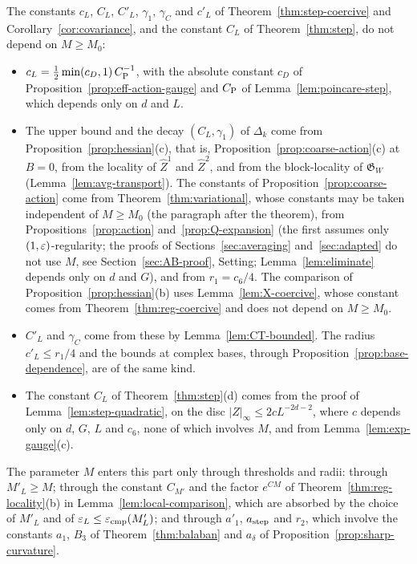 \begin{remark}\label{rem:step-M}
The constants $c_L$, $C_L$, $C'_L$, $\gamma_1$, $\gamma_C$ and $c'_L$ of Theorem~\ref{thm:step-coercive} and Corollary~\ref{cor:covariance}, and the constant $C_L$ of Theorem~\ref{thm:step}, do not depend on $M\ge M_0$:
\begin{itemize}
\item $c_L=\frac12\min(c_D,1)\,C_{\rm P}^{-1}$, with the absolute constant $c_D$ of Proposition~\ref{prop:eff-action-gauge} and $C_{\rm P}$ of Lemma~\ref{lem:poincare-step}, which depends only on $d$ and $L$.
\item The upper bound and the decay $(C_L,\gamma_1)$ of $\Delta_k$ come from Proposition~\ref{prop:hessian}(c), that is, Proposition~\ref{prop:coarse-action}(c) at $B=0$, from the locality of $\hat Z^1$ and $\hat Z^2$, and from the block-locality of $\mathfrak G_W$ (Lemma~\ref{lem:avg-transport}). The constants of Proposition~\ref{prop:coarse-action} come from Theorem~\ref{thm:variational}, whose constants may be taken independent of $M\ge M_0$ (the paragraph after the theorem), from Propositions~\ref{prop:action} and~\ref{prop:Q-expansion} (the first assumes only $(1,\varepsilon)$-regularity; the proofs of Sections~\ref{sec:averaging} and~\ref{sec:adapted} do not use $M$, see Section~\ref{sec:AB-proof}, Setting; Lemma~\ref{lem:eliminate} depends only on $d$ and $G$), and from $r_1=c_6/4$. The comparison of Proposition~\ref{prop:hessian}(b) uses Lemma~\ref{lem:X-coercive}, whose constant comes from Theorem~\ref{thm:reg-coercive} and does not depend on $M\ge M_0$.
\item $C'_L$ and $\gamma_C$ come from these by Lemma~\ref{lem:CT-bounded}. The radius $c'_L\le r_1/4$ and the bounds at complex bases, through Proposition~\ref{prop:base-dependence}, are of the same kind.
\item The constant $C_L$ of Theorem~\ref{thm:step}(d) comes from the proof of Lemma~\ref{lem:step-quadratic}, on the disc $|Z|_\infty\le2cL^{-2d-2}$, where $c$ depends only on $d$, $G$, $L$ and $c_6$, none of which involves $M$, and from Lemma~\ref{lem:exp-gauge}(c).
\end{itemize}
The parameter $M$ enters this part only through thresholds and radii: through $M'_L\ge M$; through the constant $C_{M'}$ and the factor $e^{CM}$ of Theorem~\ref{thm:reg-locality}(b) in Lemma~\ref{lem:local-comparison}, which are absorbed by the choice of $M'_L$ and of $\varepsilon_L\le\varepsilon_{\rm cmp}(M'_L)$; and through $a'_1$, $a_{\rm step}$ and $r_2$, which involve the constants $a_1$, $B_3$ of Theorem~\ref{thm:balaban} and $a_\delta$ of Proposition~\ref{prop:sharp-curvature}.
\end{remark}

